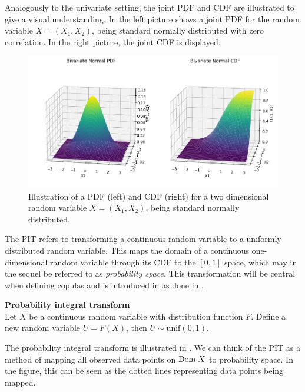 Analogously to the univariate setting, the joint \gls{PDF} and \gls{CDF} are illustrated to give a visual understanding. In  the left picture shows a joint \gls{PDF} for the random variable $X = (X_1, X_2)$, being standard normally distributed with zero correlation. In the right picture, the joint \gls{CDF} is displayed. 

\begin{figure}
    \centering
    \includegraphics[width=1\linewidth]{3Theory/pictures/MultivariatePDFandCDF.png}
    \caption{Illustration of a \gls{PDF} (left) and \gls{CDF} (right) for a two dimensional random variable $X = (X_1,X_2)$, being standard normally distributed.}
    \label{fig:JointCDFandPDF}
\end{figure}

The \gls{PIT} refers to transforming a continuous random variable to a uniformly distributed random variable. 
This maps the domain of a continuous one-dimensional random variable through its \gls{CDF} to the $[0,1]$ space, which may in the sequel be referred to as \emph{probability space}. This transformation will be central when defining copulas and is introduced in  as done in \citet[p.~27]{Danielsson2011}. 

\begin{theorem}\label{the:PIT} \textbf{Probability integral transform} \\
    Let $X$ be a continuous random variable with distribution function $F$. Define a new random variable $U = F(X)$, then $U \sim \mathrm{unif}(0,1)$. 
\end{theorem}

The probability integral transform is illustrated in . We can think of the \gls{PIT} as a method of mapping all observed data points on $\mathrm{Dom \;} X$  to probability space. In the figure, this can be seen as the dotted lines representing data points being mapped. 

